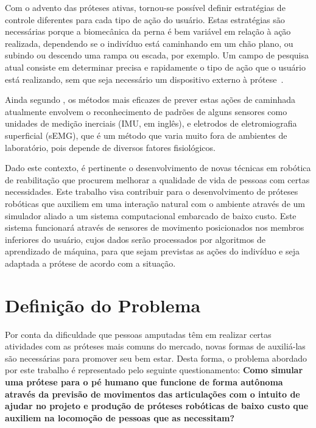 Com o advento das próteses ativas, tornou-se possível definir estratégias de controle diferentes para cada tipo de ação do usuário. Estas estratégias são necessárias porque a biomecânica da perna é bem variável em relação à ação realizada, dependendo se o indivíduo está caminhando em um chão plano, ou subindo ou descendo uma rampa ou escada, por exemplo. Um campo de pesquisa atual consiste em determinar precisa e rapidamente o tipo de ação que o usuário está realizando, sem que seja necessário um dispositivo externo à prótese~\cite{stolyarov:2017}.

Ainda segundo , os métodos mais eficazes de prever estas ações de caminhada atualmente envolvem o reconhecimento de padrões de alguns sensores como unidades de medição inerciais (IMU, em inglês), e eletrodos de eletromiografia superficial (sEMG), que é um método que varia muito fora de ambientes de laboratório, pois depende de diversos fatores fisiológicos.

Dado este contexto, é pertinente o desenvolvimento de novas técnicas em robótica de reabilitação que procurem melhorar a qualidade de vida de pessoas com certas necessidades. Este trabalho visa contribuir para o desenvolvimento de próteses robóticas que auxiliem em uma interação natural com o ambiente através de um simulador aliado a um sistema computacional embarcado de baixo custo. Este sistema funcionará através de sensores de movimento posicionados nos membros inferiores do usuário, cujos dados serão processados por algoritmos de aprendizado de máquina, para que sejam previstas as ações do indivíduo e seja adaptada a prótese de acordo com a situação.

\section{Definição do Problema}

Por conta da dificuldade que pessoas amputadas têm em realizar certas atividades com as próteses mais comuns do mercado, novas formas de auxiliá-las são necessárias para promover seu bem estar. Desta forma, o problema abordado por este trabalho é representado pelo seguinte questionamento: \textbf{Como simular uma prótese para o pé humano que funcione de forma autônoma através da previsão de movimentos das articulações com o intuito de ajudar no projeto e produção de próteses robóticas de baixo custo que auxiliem na locomoção de pessoas que as necessitam?}

